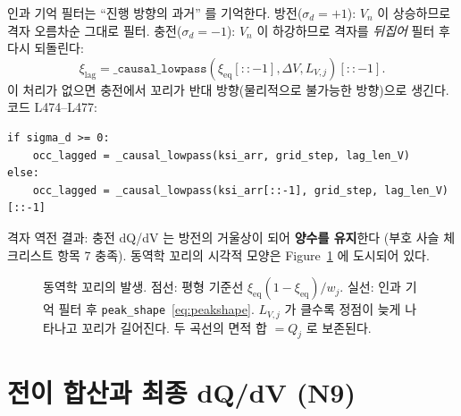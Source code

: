 \documentclass[11pt,a4paper]{article}
\newcommand{\eq}{\mathrm{eq}}
\begin{document}
인과 기억 필터는 ``진행 방향의 과거'' 를 기억한다.
방전($\sigma_d=+1$): $V_n$ 이 상승하므로 격자 오름차순 그대로 필터.
충전($\sigma_d=-1$): $V_n$ 이 하강하므로 격자를 \emph{뒤집어} 필터 후 다시 되돌린다:
\begin{equation}
\xi_\mathrm{lag} = \texttt{\_causal\_lowpass}(\xi_\eq[::-1], \Delta V, L_{V,j})[::-1].
\label{eq:reverse}
\end{equation}
이 처리가 없으면 충전에서 꼬리가 반대 방향(물리적으로 불가능한 방향)으로 생긴다.
코드 L474--L477:
\begin{verbatim}
if sigma_d >= 0:
    occ_lagged = _causal_lowpass(ksi_arr, grid_step, lag_len_V)
else:
    occ_lagged = _causal_lowpass(ksi_arr[::-1], grid_step, lag_len_V)[::-1]
\end{verbatim}
격자 역전 결과: 충전 dQ/dV 는 방전의 거울상이 되어 \textbf{양수를 유지}한다
(부호 사슬 체크리스트 항목 7 충족). 동역학 꼬리의 시각적 모양은
Figure~\ref{fig:tail} 에 도시되어 있다.

\begin{figure}[t]
\centering
{}
\caption{동역학 꼬리의 발생. 점선: 평형 기준선 $\xi_\eq(1-\xi_\eq)/w_j$.
실선: 인과 기억 필터 후 \texttt{peak\_shape}~\eqref{eq:peakshape}.
$L_{V,j}$ 가 클수록 정점이 늦게 나타나고 꼬리가 길어진다.
두 곡선의 면적 합 $= Q_j$ 로 보존된다.}
\label{fig:tail}
\end{figure}

\section{전이 합산과 최종 dQ/dV (N9)}\label{sec:total}
\end{document}
